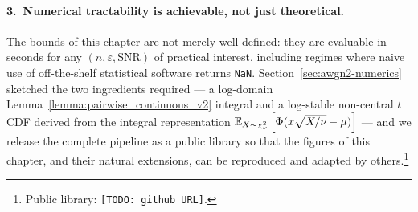 \paragraph{3.\ Numerical tractability is achievable, not just theoretical.}
The bounds of this chapter are not merely well-defined: they are evaluable in seconds for any $(n, \varepsilon, \mathrm{SNR})$ of practical interest, including regimes where naive use of off-the-shelf statistical software returns \texttt{NaN}.  Section~\ref{sec:awgn2-numerics} sketched the two ingredients required --- a log-domain Lemma~\ref{lemma:pairwise_continuous_v2} integral and a log-stable non-central $t$ CDF derived from the integral representation $\mathbb{E}_{X\sim\chi^2_\nu} \left[ \Phi(x\sqrt{X/\nu}-\mu) \right]$ --- and we release the complete pipeline as a public library so that the figures of this chapter, and their natural extensions, can be reproduced and adapted by others.\footnote{Public library: \texttt{[TODO: github URL]}.}
